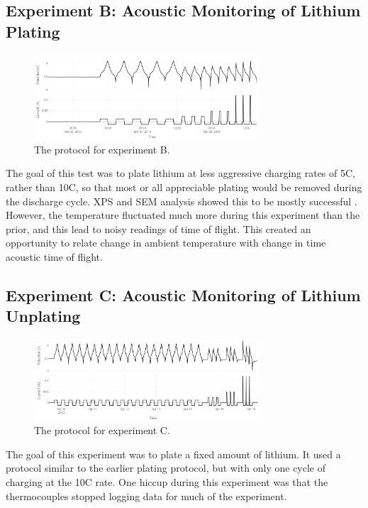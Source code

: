 \subsection{Experiment B: Acoustic Monitoring of Lithium Plating}
\begin{figure}[t]\label{fig:neware0325}
    \includegraphics[width=0.75\textwidth]{Thesis/neware0325.PNG}
    \centering
    \caption{The protocol for experiment B.}
\end{figure}

The goal of this test was to plate lithium at less aggressive charging rates of 5C, rather than 10C, so that most or all appreciable plating would be removed during the discharge cycle. XPS and SEM analysis showed this to be mostly successful . However, the temperature fluctuated much more during this experiment than the prior, and this lead to noisy readings of time of flight. This created an opportunity to relate change in ambient temperature with change in time acoustic time of flight. 

\subsection{Experiment C: Acoustic Monitoring of Lithium Unplating}
\begin{figure}[t]\label{fig:neware0409}
    \includegraphics[width=0.75\textwidth]{Thesis/neware0409.PNG}
    \centering
    \caption{The protocol for experiment C.}
\end{figure}
The goal of this experiment was to plate a fixed amount of lithium. It used a protocol similar to the earlier plating protocol, but with only one cycle of charging at the 10C rate. One hiccup during this experiment was that the thermocouples stopped logging data for much of the experiment. 


